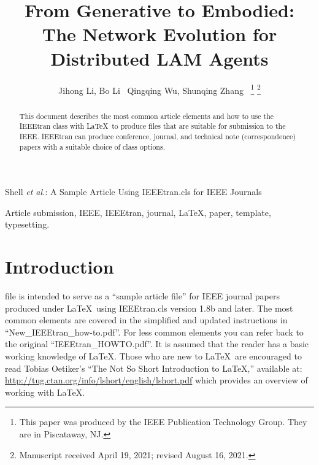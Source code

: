 \documentclass[lettersize,journal]{IEEEtran}
\begin{document}
\title{From Generative to Embodied: The Network Evolution for Distributed LAM Agents}

\author{Jihong Li, Bo Li~ Qingqing Wu, Shunqing Zhang~
\thanks{This paper was produced by the IEEE Publication Technology Group. They are in Piscataway, NJ.}%
\thanks{Manuscript received April 19, 2021; revised August 16, 2021.}}

%
{Shell \MakeLowercase{\textit{et al.}}: A Sample Article Using IEEEtran.cls for IEEE Journals}


\maketitle

\begin{abstract}
This document describes the most common article elements and how to use the IEEEtran class with \LaTeX \ to produce files that are suitable for submission to the IEEE.  IEEEtran can produce conference, journal, and technical note (correspondence) papers with a suitable choice of class options. 
\end{abstract}

\begin{IEEEkeywords}
Article submission, IEEE, IEEEtran, journal, \LaTeX, paper, template, typesetting.
\end{IEEEkeywords}

\section{Introduction}
 file is intended to serve as a ``sample article file''
for IEEE journal papers produced under \LaTeX\ using
IEEEtran.cls version 1.8b and later. The most common elements are covered in the simplified and updated instructions in ``New\_IEEEtran\_how-to.pdf''. For less common elements you can refer back to the original ``IEEEtran\_HOWTO.pdf''. It is assumed that the reader has a basic working knowledge of \LaTeX. Those who are new to \LaTeX \ are encouraged to read Tobias Oetiker's ``The Not So Short Introduction to \LaTeX ,'' available at: \url{http://tug.ctan.org/info/lshort/english/lshort.pdf} which provides an overview of working with \LaTeX.
\end{document}

